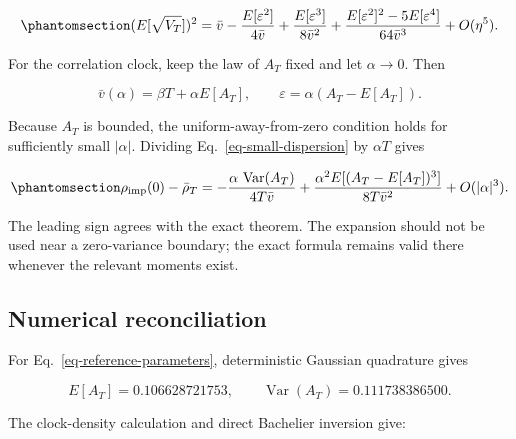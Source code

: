 \documentclass[
  english,
  11pt,
  letterpaper,
  DIV=11,
  numbers=noendperiod]{scrartcl}
\theoremstyle{plain}
\theoremstyle{plain}
\theoremstyle{plain}
\theoremstyle{plain}
\theoremstyle{remark}
\begin{document}
\begin{equation}\protect\phantomsection\label{eq-small-dispersion}{
(E[\sqrt{V_T}])^2
=\bar v
-\frac{E[\varepsilon^2]}{4\bar v}
+\frac{E[\varepsilon^3]}{8\bar v^2}
+\frac{E[\varepsilon^2]^2-5E[\varepsilon^4]}
{64\bar v^3}
+O(\eta^5).
}\end{equation}

For the correlation clock, keep the law of \(A_T\) fixed and let
\(\alpha\to0\). Then

\[
\bar v(\alpha)=\beta T+\alpha E[A_T],
\qquad
\varepsilon=\alpha(A_T-E[A_T]).
\]

Because \(A_T\) is bounded, the uniform-away-from-zero condition holds
for sufficiently small \(|\alpha|\). Dividing
Eq.~\ref{eq-small-dispersion} by \(\alpha T\) gives

\begin{equation}\protect\phantomsection\label{eq-wedge-expansion}{
\rho_{\mathrm{imp}}(0)-\bar\rho_T
=-\frac{\alpha\,\operatorname{Var}(A_T)}
{4T\bar v}
+\frac{\alpha^2E[(A_T-E[A_T])^3]}
{8T\bar v^2}
+O(|\alpha|^3).
}\end{equation}

The leading sign agrees with the exact theorem. The expansion should not
be used near a zero-variance boundary; the exact formula remains valid
there whenever the relevant moments exist.

\subsection{Numerical reconciliation}\label{numerical-reconciliation}

For Eq.~\ref{eq-reference-parameters}, deterministic Gaussian quadrature
gives

\[
E[A_T]=0.106628721753,
\qquad
\operatorname{Var}(A_T)=0.111738386500.
\]

The clock-density calculation and direct Bachelier inversion give:
\end{document}
